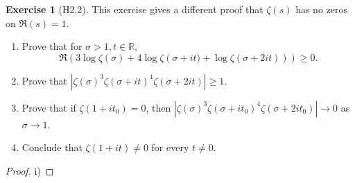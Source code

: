 \documentclass[reqno]{amsart}
\theoremstyle{definition}
\newtheorem{exercise}[theorem]{Exercise}
\theoremstyle{remark}
\begin{document}
\begin{exercise}[H2.2]
    This exercise gives a different proof that
    $\zeta(s)$ has no zeros on
    $\Re(s) = 1$.
    \begin{enumerate}
        \item Prove that for
            $\sigma > 1, t \in \mathbb{R}$,
            \[
            \Re \left( 3 \log \zeta (\sigma)
            + 4 \log \zeta \left( \sigma + it)
        + \log \zeta \left( \sigma+ 2it \right) \right) \right) 
        \ge 0.
            \] 
        \item Prove that
            $\left| \zeta(\sigma)^3
            \zeta \left( \sigma + it \right)^{4} 
            \zeta\left( \sigma + 2it \right) \right| \ge 1 $.
        \item Prove that if $\zeta \left( 1+ it_0 \right) =0$,
            then
            $\left| \zeta(\sigma)^3
            \zeta\left( \sigma + it_0 \right)^{4}
            \zeta \left( \sigma + 2it_0 \right) \right| 
            \to 0$ as $\sigma \to 1$.
        \item Conclude that $\zeta \left( 1+it \right) \neq 0
            $ for every $t \neq 0$.
    \end{enumerate}
\end{exercise}

\begin{proof}
    i) 
\end{proof}



\end{document}
